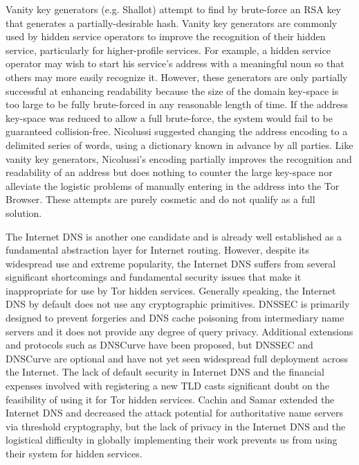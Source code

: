 \documentclass[conference]{IEEEtran}
\begin{document}
Vanity key generators (e.g. Shallot\cite{KatmagicShallot}) attempt to find by brute-force an RSA key that generates a partially-desirable hash. Vanity key generators are commonly used by hidden service operators to improve the recognition of their hidden service, particularly for higher-profile services\cite{syversongenuine}. For example, a hidden service operator may wish to start his service's address with a meaningful noun so that others may more easily recognize it. However, these generators are only partially successful at enhancing readability because the size of the domain key-space is too large to be fully brute-forced in any reasonable length of time. If the address key-space was reduced to allow a full brute-force, the system would fail to be guaranteed collision-free. Nicolussi suggested changing the address encoding to a delimited series of words, using a dictionary known in advance by all parties\cite{nicolussi2011human}. Like vanity key generators, Nicolussi's encoding partially improves the recognition and readability of an address but does nothing to counter the large key-space nor alleviate the logistic problems of manually entering in the address into the Tor Browser. These attempts are purely cosmetic and do not qualify as a full solution.

The Internet DNS is another one candidate and is already well established as a fundamental abstraction layer for Internet routing. However, despite its widespread use and extreme popularity, the Internet DNS suffers from several significant shortcomings and fundamental security issues that make it inappropriate for use by Tor hidden services. Generally speaking, the Internet DNS by default does not use any cryptographic primitives. DNSSEC is primarily designed to prevent forgeries and DNS cache poisoning from intermediary name servers and it does not provide any degree of query privacy\cite{wachs2014censorship}. Additional extensions and protocols such as DNSCurve\cite{bernstein2009dnscurve} have been proposed, but DNSSEC and DNSCurve are optional and have not yet seen widespread full deployment across the Internet. The lack of default security in Internet DNS and the financial expenses involved with registering a new TLD casts significant doubt on the feasibility of using it for Tor hidden services. Cachin and Samar\cite{cachin2004secure} extended the Internet DNS and decreased the attack potential for authoritative name servers via threshold cryptography, but the lack of privacy in the Internet DNS and the logistical difficulty in globally implementing their work prevents us from using their system for hidden services.
\end{document}
